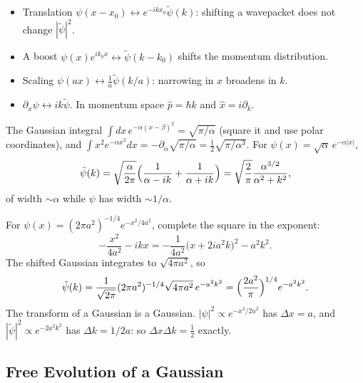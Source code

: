 \begin{fact}
\leavevmode
\begin{itemize}
    \item Translation $\psi(x-x_0)\leftrightarrow e^{-ikx_0}\tilde\psi(k)$: shifting a wavepacket does not change $|\tilde\psi|^2$.
    \item A boost $\psi(x)e^{ik_0x}\leftrightarrow\tilde\psi(k-k_0)$ shifts the momentum distribution.
    \item Scaling $\psi(ax)\leftrightarrow\frac1a\tilde\psi(k/a)$: narrowing in $x$ broadens in $k$.
    \item $\partial_x\psi\leftrightarrow ik\tilde\psi$. In momentum space $\hat{p} = \hbar k$ and $\hat{x} = i\partial_k$.
\end{itemize}
\end{fact}

\begin{example}
The Gaussian integral $\int dx\,e^{-\alpha(x-\beta)^2} = \sqrt{\pi/\alpha}$ (square it and use polar coordinates), and $\int x^2e^{-\alpha x^2}dx = -\partial_\alpha\sqrt{\pi/\alpha} = \frac12\sqrt{\pi/\alpha^3}$. For $\psi(x) = \sqrt\alpha\,e^{-\alpha|x|}$,
\[
    \tilde\psi(k) = \sqrt{\frac{\alpha}{2\pi}}\Bigl(\frac{1}{\alpha-ik} + \frac{1}{\alpha+ik}\Bigr) = \sqrt{\frac{2}{\pi}}\frac{\alpha^{3/2}}{\alpha^2+k^2},
\]
of width $\sim\alpha$ while $\psi$ has width $\sim1/\alpha$.
\end{example}

\begin{example}
For $\psi(x) = (2\pi a^2)^{-1/4}e^{-x^2/4a^2}$, complete the square in the exponent:
\[
    -\frac{x^2}{4a^2} - ikx = -\frac{1}{4a^2}\bigl(x + 2ia^2k\bigr)^2 - a^2k^2 .
\]
The shifted Gaussian integrates to $\sqrt{4\pi a^2}$, so
\[
    \tilde\psi(k) = \frac{1}{\sqrt{2\pi}}(2\pi a^2)^{-1/4}\sqrt{4\pi a^2}\,e^{-a^2k^2} = \Bigl(\frac{2a^2}{\pi}\Bigr)^{1/4}e^{-a^2k^2}.
\]
The transform of a Gaussian is a Gaussian. $|\psi|^2\propto e^{-x^2/2a^2}$ has $\Delta x = a$, and $|\tilde\psi|^2\propto e^{-2a^2k^2}$ has $\Delta k = 1/2a$: so $\Delta x\Delta k = \frac12$ exactly.
\end{example}

\subsection{Free Evolution of a Gaussian}

